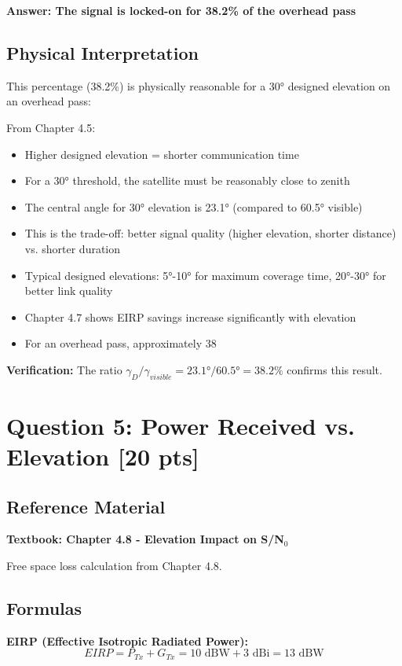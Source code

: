 \documentclass[11pt,letterpaper]{article}
\begin{document}
\textbf{Answer: The signal is locked-on for 38.2\% of the overhead pass}

\subsection{Physical Interpretation}
This percentage (38.2\%) is physically reasonable for a 30° designed elevation on an overhead pass:

From Chapter 4.5:
\begin{itemize}
    \item Higher designed elevation = shorter communication time
    \item For a 30° threshold, the satellite must be reasonably close to zenith
    \item The central angle for 30° elevation is 23.1° (compared to 60.5° visible)
    \item This is the trade-off: better signal quality (higher elevation, shorter distance) vs. shorter duration
    \item Typical designed elevations: 5°-10° for maximum coverage time, 20°-30° for better link quality
    \item Chapter 4.7 shows EIRP savings increase significantly with elevation
    \item For an overhead pass, approximately 38%
\end{itemize}

\textbf{Verification:} The ratio $\gamma_D / \gamma_{visible} = 23.1° / 60.5° = 38.2\%$ confirms this result.

\section{Question 5: Power Received vs. Elevation [20 pts]}

\subsection{Reference Material}
\textbf{Textbook: Chapter 4.8 - Elevation Impact on S/N$_0$}

Free space loss calculation from Chapter 4.8.

\subsection{Formulas}
\textbf{EIRP (Effective Isotropic Radiated Power):}
\begin{equation}
EIRP = P_{Tx} + G_{Tx} = 10 \text{ dBW} + 3 \text{ dBi} = 13 \text{ dBW}
\end{equation}
\end{document}
